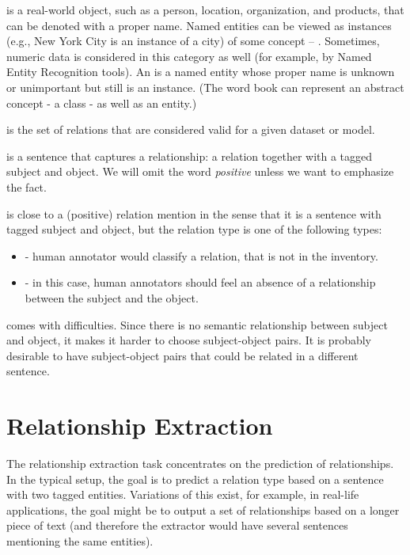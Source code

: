  is a real-world object, such as a person, location, organization, and products, that can be denoted with a proper name. Named entities can be viewed as instances (e.g., New York City is an instance of a city) of some concept -- . Sometimes, numeric data is considered in this category as well (for example, by Named Entity Recognition tools). An  is a named entity whose proper name is unknown or unimportant but still is an instance. (The word book can represent an abstract concept - a class - as well as an entity.) 

 is the set of relations that are considered valid for a given dataset or model.

 is a sentence that captures a relationship: a relation together with a tagged subject and object. We will omit the word \textit{positive} unless we want to emphasize the fact.

 is close to a (positive) relation mention in the sense that it is a sentence with tagged subject and object, but the relation type is one of the following types: 
\begin{itemize}
\item {} - human annotator would classify a relation, that is not in the inventory.
\item {} - in this case, human annotators should feel an absence of a relationship between the subject and the object.

\end{itemize}

 comes with difficulties. Since there is no semantic relationship between subject and object, it makes it harder to choose subject-object pairs. It is probably desirable to have subject-object pairs that could be related in a different sentence.


\section{Relationship Extraction}
The relationship extraction task concentrates on the prediction of relationships. In the typical setup, the goal is to predict a relation type based on a sentence with two tagged entities. Variations of this exist, for example, in real-life applications, the goal might be to output a set of relationships based on a longer piece of text (and therefore the extractor would have several sentences mentioning the same entities). 

